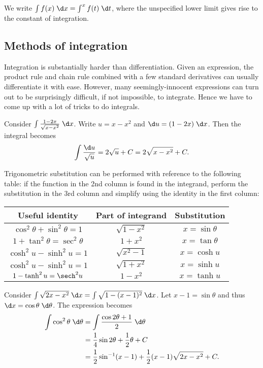 \documentclass[a4paper]{article}
\begin{document}
\begin{notation}
  We write $\int f(x)\;\d x= \int^x f(t)\;\d t$, where the unspecified lower limit gives rise to the constant of integration.
\end{notation}

\subsection{Methods of integration}
Integration is substantially harder than differentiation. Given an expression, the product rule and chain rule combined with a few standard derivatives can usually differentiate it with ease. However, many seemingly-innocent expressions can turn out to be surprisingly difficult, if not impossible, to integrate. Hence we have to come up with a lot of tricks to do integrals.

\begin{eg}
  Consider $\int \frac{1 - 2x}{\sqrt{x - x^2}}\;\d x$. Write $u = x - x^2$ and $\d u = (1 - 2x)\;\d x$. Then the integral becomes
  \[
    \int \frac{\d u}{\sqrt{u}} = 2\sqrt{u} + C = 2\sqrt{x - x^2} + C.
  \]
\end{eg}

Trigonometric substitution can be performed with reference to the following table: if the function in the 2nd column is found in the integrand, perform the substitution in the 3rd column and simplify using the identity in the first column:
\begin{center}
  \begin{tabular}{ccc}
    \toprule
    Useful identity & Part of integrand & Substitution \\
    \midrule
    $\cos^2\theta + \sin^2\theta = 1$ & $\sqrt{1 - x^2}$ & $x = \sin \theta$ \\
    $1 + \tan^2\theta = \sec^2\theta$ & $1 + x^2$ & $x = \tan\theta$ \\
    $\cosh^2u - \sinh^2 u = 1$ & $\sqrt{x^2 - 1}$ & $x=\cosh u$ \\
    $\cosh^2u - \sinh^2 u = 1$ & $\sqrt{1 + x^2}$ & $x=\sinh u$ \\
    $1 - \tanh^2 u = \sech^2u$ & $1 - x^2$ & $x = \tanh u$ \\
    \bottomrule
  \end{tabular}
\end{center}
\begin{eg}
  Consider $\int \sqrt{2x - x^2}\;\d x = \int\sqrt{1 - (x - 1)^2}\;\d x$. Let $x - 1=\sin\theta$ and thus $\d x = \cos \theta\;\d\theta$. The expression becomes
  \begin{align*}
    \int \cos^2\theta \;\d \theta &= \int\frac{\cos 2\theta + 1}{2}\;\d \theta\\
    &= \frac{1}{4}\sin 2\theta + \frac{1}{2}\theta + C\\
    &= \frac{1}{2}\sin^{-1}(x - 1) + \frac{1}{2}(x - 1)\sqrt{2x - x^2} + C.
  \end{align*}
\end{eg}
\end{document}
